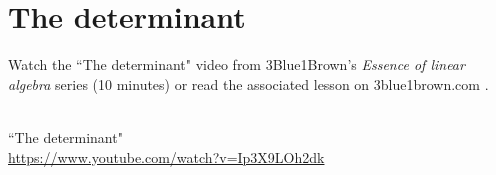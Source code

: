 \section{The determinant}

Watch the ``The determinant" video from 3Blue1Brown's \textit{Essence of linear
algebra} series (10 minutes) or read the associated lesson on 3blue1brown.com
\cite{bib:3b1b_linalg_the_determinant}.
\begin{bookfigure}
   \\
  \tiny
  ``The determinant" \\
  \url{https://www.youtube.com/watch?v=Ip3X9LOh2dk}
\end{bookfigure}
